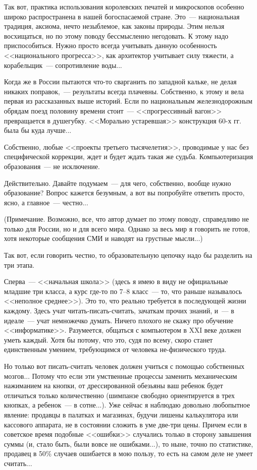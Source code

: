 \documentclass{scrbook}
\newcommand{\flqq}{<<}
\newcommand{\frqq}{>>}
\newcommand{\mdash}{~--- }
\newcommand{\ndash}{--}
\newcommand{\commamdash}{~--- } %
\begin{document}
Так вот, практика использования королевских печатей и микроскопов особенно широко распространена в нашей богоспасаемой стране. Это{\mdash}национальная традиция, аксиома, нечто незыблемое, как законы природы. Этим нельзя восхищаться, но по этому поводу бессмысленно негодовать. К этому надо приспособиться. Нужно просто всегда учитывать данную особенность {\flqq}национального прогресса{\frqq}, как архитектор учитывает силу тяжести, а корабельщик{\mdash}сопротивление воды...

Когда же в России пытаются что-то сварганить по западной кальке, не делая никаких поправок,{\commamdash} результаты всегда плачевны. Собственно, к этому и вела первая из рассказанных выше историй. Если по национальным железнодорожным обрядам поезд половину времени стоит{\mdash}{\flqq}прогрессивный вагон{\frqq} превращается в душегубку. {\flqq}Морально устаревшая{\frqq} конструкция 60-х гг. была бы куда лучше...

Собственно, любые {\flqq}проекты третьего тысячелетия{\frqq}, проводимые у нас без специфической коррекции, ждет и будет ждать такая же судьба. Компьютеризация образования{\mdash}не исключение.

Действительно. Давайте подумаем{\mdash}для чего, собственно, вообще нужно образование? Вопрос кажется безумным, а вот вы попробуйте ответить просто, ясно, а главное{\mdash}честно...

(Примечание. Возможно, все, что автор думает по этому поводу, справедливо не только для России, но и для всего мира. Однако за весь мир я говорить не готов, хотя некоторые сообщения СМИ и наводят на грустные мысли...)

Так вот, если говорить честно, то образовательную цепочку надо бы разделить на три этапа.

Сперва{\mdash}{\flqq}начальная школа{\frqq} (здесь я имею в виду не официальные младшие три класса, а курс где-то по 7{\ndash}8 класс{\mdash}то, что раньше называлось {\flqq}неполное среднее{\frqq}). Это то, что реально требуется в последующей жизни каждому. Здесь учат читать-писать-считать, зачаткам прочих знаний, и{\mdash}в идеале{\mdash}учат немножечко думать. Ничего плохого не скажу про обучение {\flqq}информатике{\frqq}. Разумеется, общаться с компьютером в XXI веке должен уметь каждый. Хотя бы потому, что это, судя по всему, скоро станет единственным умением, требующимся от человека не-физического труда.

Но только вот писать-считать человек должен учиться с помощью собственных мозгов... Потому что если эти умственные процессы заменить механическим нажиманием на кнопки, от дрессированной обезьяны ваш ребенок будет отличаться только количественно (шимпанзе свободно ориентируется в трех кнопках, а ребенок{\mdash}в сотне...). Уже сейчас я наблюдаю довольно любопытное явление: продавцы в палатках и магазинах, будучи лишены калькулятора или кассового аппарата, не в состоянии сложить в уме две-три цены. Причем если в советское время подобные {\flqq}ошибки{\frqq} случались только в сторону завышения суммы (и, стало быть, были вовсе не ошибками...), то ныне, точно по статистике, продавец в 50\% случаев ошибается в мою пользу, то есть на самом деле не умеет считать...
\end{document}
